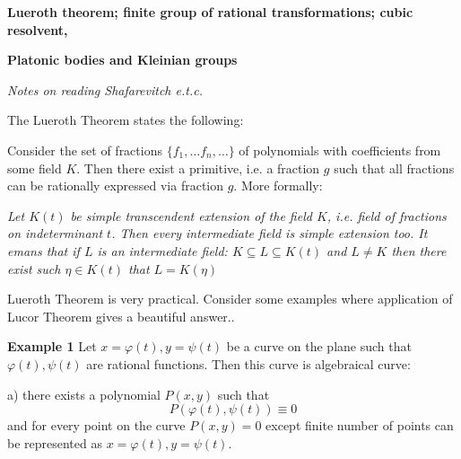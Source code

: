 

 \baselineskip=14pt


\def\p {\partial}
\def \D {\Delta_{d{\bf v}}}
\def \Ds  {\Delta^{\#}}
\def\t{\tilde}
\def\s {\sigma}
\def\vare {\varepsilon}
\def\L {\Lambda}
\def\Darboux {$z^A=$  $x^1,\dots,x^n$, $\theta_1,\dots,\theta_n$}
\def\a{\alpha}
\def\O{\Omega}
\def\d{\delta}
\def\dv  {{d{\bf{v}}}}
\def\A {{\cal A}}
\def\R {I\!R}
\def\t {\tilde}


             \centerline
             {\bf Lueroth theorem; finite group of rational transformations; cubic
             resolvent,}


             \centerline
             {\bf Platonic bodies and Kleinian groups}


           \bigskip \centerline{\it Notes on reading Shafarevitch e.t.c.}

             \bigskip
  The Lueroth Theorem states the following:

    Consider the set of fractions $\{f_1,\dots f_n,\dots\}$
    of polynomials with coefficients from some field $K$. Then
    there exist a primitive, i.e. a fraction $g$  such that all
    fractions can be rationally expressed via fraction $g$.
    More formally:

      {\it Let $K(t)$ be simple transcendent extension of the field $K$,
      i.e. field of fractions on indeterminant $t$. Then every intermediate
      field is simple extension too. It emans that if $L$ is an
      intermediate field: $K\subseteq L\subseteq K(t)$ and $L\not=K$
      then there exist such $\eta\in K(t)$ that $L=K(\eta)$}


  Lueroth Theorem is very practical. Consider some examples where application of Lucor Theorem
  gives a beautiful answer..

  \bigskip

   {\bf Example 1}
    Let $x=\varphi(t), y=\psi(t)$ be a curve on the plane such that $\varphi(t),\psi(t)$
    are rational functions. Then this curve is algebraical curve:

    a) there exists a polynomial $P(x,y)$ such that
    $$
    P\left(\varphi(t),\psi(t)\right)\equiv 0
    $$
and for every point on the curve  $P(x,y)=0$ except finite number of points can be
represented as  $x=\varphi(t), y=\psi(t)$.

